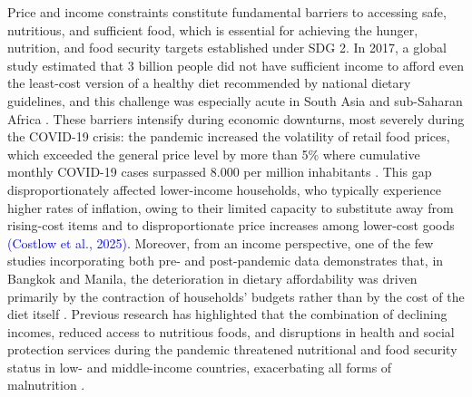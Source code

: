 \documentclass[Afour, sageh,times]{sagej}
\begin{document}
Price and income constraints constitute fundamental barriers to accessing safe, nutritious, and sufficient food, which is essential for achieving the hunger, nutrition, and food security targets established under SDG 2. In 2017, a global study estimated that 3 billion people did not have sufficient income to afford even the least-cost version of a healthy diet recommended by national dietary guidelines, and this challenge was especially acute in South Asia and sub-Saharan Africa \citep{Herforth2020}. These barriers intensify during economic downturns, most severely during the COVID-19 crisis: the pandemic increased the volatility of retail food prices, which exceeded the general price level by more than 5\% where cumulative monthly COVID-19 cases surpassed 8.000 per million inhabitants \citep{Bai2022covid}. This gap disproportionately affected lower-income households, who typically experience higher rates of inflation, owing to their limited capacity to substitute away from rising-cost items and to disproportionate price increases among lower-cost goods \textcolor{blue}{(Costlow et al., 2025)}. Moreover, from an income perspective, one of the few studies incorporating both pre- and post-pandemic data demonstrates that, in Bangkok and Manila, the deterioration in dietary affordability was driven primarily by the contraction of households' budgets rather than by the cost of the diet itself \citep{Mwambi2023}. Previous research has highlighted that the combination of declining incomes, reduced access to nutritious foods, and disruptions in health and social protection services during the pandemic threatened nutritional and food security status in low- and middle-income countries, exacerbating all forms of malnutrition \citep{Headey2020}.

\smallskip
\end{document}

